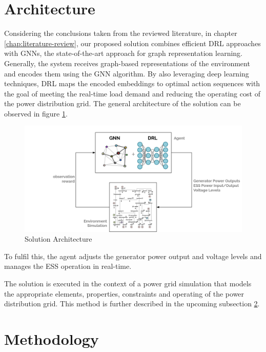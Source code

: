\section{Architecture} \label{sec:arch}

Considering the conclusions taken from the reviewed literature, in chapter \ref{chap:literature-review}, our proposed solution combines efficient \acf{DRL} approaches with \acfp{GNN}, the state-of-the-art approach for graph representation learning. Generally, the system receives graph-based representations of the environment and encodes them using the \ac{GNN} algorithm. By also leveraging deep learning techniques, \ac{DRL} maps the encoded embeddings to optimal action sequences with the goal of meeting the real-time load demand and reducing the operating cost of the power distribution grid. The general architecture of the solution can be observed in figure \ref{fig:arch}.

\begin{figure}
	\centering
	\includegraphics[width=0.85\linewidth]{./figures/arch.png}
	\caption{Solution Architecture}
	\label{fig:arch}
\end{figure}


To fulfil this, the agent adjusts the generator power output and voltage levels and manages the \ac{ESS} operation in real-time. \par
The solution is executed in the context of a power grid simulation that models the appropriate elements, properties, constraints and operating of the power distribution grid. This method is further described in the upcoming subsection \ref{sec:method}.

\section{Methodology} \label{sec:method}

